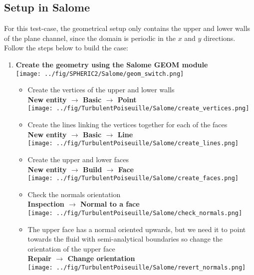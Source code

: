 \documentclass{../GPUSPHtemplate}
\begin{document}
\subsection{Setup in Salome}\label{sec:salome_turbulentPoiseuille}
For this test-case, the geometrical setup only contains the upper and lower walls of the plane channel,
since the domain is periodic in the $x$ and $y$ directions.
Follow the steps below to build the case:
\begin{enumerate}
\item \textbf{Create the geometry using the Salome GEOM module}\smallskip\\
  \texttt{[image: ../fig/SPHERIC2/Salome/geom\_switch.png]}
  \begin{itemize}
  \item Create the vertices of the upper and lower walls\\
    \textbf{New entity $\to$ Basic $\to$ Point}\smallskip\\
    \texttt{[image: ../fig/TurbulentPoiseuille/Salome/create\_vertices.png]}
  \item Create the lines linking the vertices together for each of the faces\\
    \textbf{New entity $\to$ Basic $\to$ Line}\smallskip\\
    \texttt{[image: ../fig/TurbulentPoiseuille/Salome/create\_lines.png]}
  \item Create the upper and lower faces\\
    \textbf{New entity $\to$ Build $\to$ Face}\smallskip\\
    \texttt{[image: ../fig/TurbulentPoiseuille/Salome/create\_faces.png]}
  \item Check the normals orientation\\
    \textbf{Inspection $\to$ Normal to a face}\smallskip\\
    \texttt{[image: ../fig/TurbulentPoiseuille/Salome/check\_normals.png]}
  \item The upper face has a normal oriented upwards, but we need it to point towards the fluid with semi-analytical boundaries
    so change the orientation of the upper face\\
    \textbf{Repair $\to$ Change orientation}\smallskip\\
    \texttt{[image: ../fig/TurbulentPoiseuille/Salome/revert\_normals.png]}

\end{itemize}
\end{enumerate}
\end{document}
